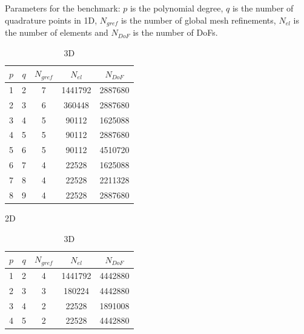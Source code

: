 \documentclass[AMA,STIX1COL]{WileyNJD-v2}
\begin{document}
%
\begin{table}[!htb]
  \caption{Parameters for the benchmark: $p$ is the polynomial degree,
  $q$ is the number of quadrature points in 1D, $N_{gref}$ is the number of global mesh refinements, $N_{el}$ is the number of elements and $N_{DoF}$ is the number of DoFs.}
  \begin{subtable}{.5\linewidth}
  \centering
  \begin{tabular}{ccccc}
  \hline
    $p$ & $q$ & $N_{gref}$ & $N_{el}$ & $N_{DoF}$ \\
  \hline
    1 & 2 & 7 & 1441792 & 2887680 \\
    2 & 3 & 6 & 360448 & 2887680 \\
    3 & 4 & 5 & 90112 & 1625088 \\
    4 & 5 & 5 & 90112 & 2887680 \\
    5 & 6 & 5 & 90112 & 4510720 \\
    6 & 7 & 4 & 22528 & 1625088 \\
    7 & 8 & 4 & 22528 & 2211328 \\
    8 & 9 & 4 & 22528 & 2887680 \\
  \hline
  \end{tabular}
  \caption{2D}
  \label{tab:input_parameters_2d}
  \end{subtable}
  \begin{subtable}{.5\linewidth}
  \centering
  \begin{tabular}{ccccc}
  \hline
    $p$ & $q$ & $N_{gref}$ & $N_{el}$ & $N_{DoF}$ \\
  \hline
    1 & 2 & 4 & 1441792 & 4442880 \\
    2 & 3 & 3 & 180224 & 4442880 \\
    3 & 4 & 2 & 22528 & 1891008 \\
    4 & 5 & 2 & 22528 & 4442880 \\
  \hline
  \end{tabular}
  \caption{3D}
  \label{tab:input_parameters_3d}
  \end{subtable}
\end{table}
\end{document}
